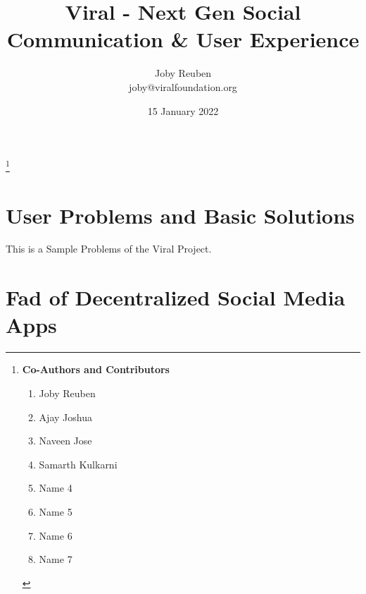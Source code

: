 \documentclass[10pt]{article}
\title{Viral - Next Gen Social Communication \& User Experience}
\date{15 January 2022}
\author{Joby Reuben \\ joby@viralfoundation.org}
\begin{document}
\maketitle
\begin{abstract}
\lipsum[1]\lipsum[1]
\end{abstract}

\footnote{

\textbf{Co-Authors and Contributors}\\ 
\begin{enumerate}[leftmargin=+0.3in]
\item Joby Reuben
\item Ajay Joshua
\item Naveen Jose
\item Samarth Kulkarni
\item Name 4
\item Name 5
\item Name 6
\item Name 7
\end{enumerate}

}


\newpage
   \tableofcontents\pagebreak 
   
\section{User Problems and Basic Solutions}
This is a Sample Problems of the Viral Project.

\section{Fad of Decentralized Social Media Apps}
\end{document}

